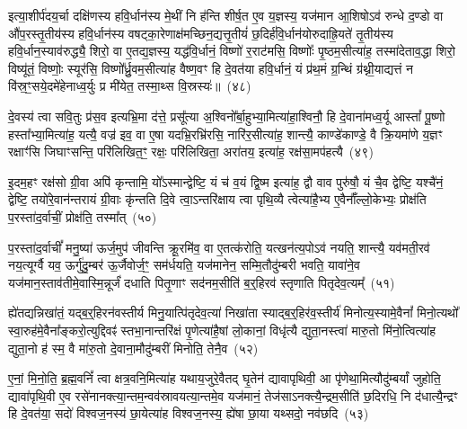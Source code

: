 इत्या॒शीर्प॑दय॒र्चा दक्षि॑णस्य हवि॒र्धान॑स्य मे॒थीं नि ह॑न्ति शीर्\mbox{}ष॒त ए॒व य॒ज्ञस्य॒ यज॑मान आ॒शिषो\-ऽव॑ रुन्धे द॒ण्डो वा औ॑प॒रस्तृ॒तीय॑स्य हवि॒र्धान॑स्य वषट्का॒रेणाक्ष॑मच्छिन॒द्यत्तृ॒तीयं॑ छ॒दिर्\mbox{}ह॑वि॒र्धान॑योरुदाह्रि॒यते॑ तृ॒तीय॑स्य हवि॒र्धान॒स्याव॑रुद्ध्यै॒ शिरो॒ वा ए॒तद्य॒ज्ञस्य॒ यद्ध॑वि॒र्धानं॒ विष्णो॑ र॒राट॑मसि॒ विष्णोः᳚ पृ॒ष्ठम॒सीत्या॑ह॒ तस्मा॑देताव॒द्धा शिरो॒ विष्यू॑तं॒ विष्णोः॒ स्यूर॑सि॒ विष्णो᳚र्ध्रु॒वम॒सीत्या॑ह वैष्ण॒वꣳ हि दे॒वत॑या हवि॒र्धानं॒ यं प्र॑थ॒मं ग्र॒न्थिं ग्र॑थ्नी॒याद्यत्तं न वि॑स्र॒ꣳ॒सये॒दमे॑हेनाध्व॒र्युः प्र मी॑येत॒ तस्मा॒थ्स वि॒स्रस्यः॑॥~(४८)

{\anuvakamend[{पत्नी॑ हन्युर्वा पृथि॒व्या विष्यू॑तं॒ विष्णोः॒ षड्विꣳ॑शतिश्च}]}%

दे॒वस्य॑ त्वा सवि॒तुः प्र॑स॒व इत्यभ्रि॒मा द॑त्ते॒ प्रसू᳚त्या अ॒श्विनो᳚र्बा॒हुभ्या॒मित्या॑हा॒श्विनौ॒ हि दे॒वाना॑मध्व॒र्यू आस्तां᳚ पू॒ष्णो हस्ता᳚भ्या॒मित्या॑ह॒ यत्यै॒ वज्र॑ इव॒ वा ए॒षा यदभ्रि॒रभ्रि॑रसि॒ नारि॑र॒सीत्या॑ह॒ शान्त्यै॒ काण्डे॑काण्डे॒ वै क्रि॒यमा॑णे य॒ज्ञꣳ रक्षाꣳ॑सि जिघाꣳसन्ति॒ परि॑लिखित॒ꣳ॒ रक्षः॒ परि॑लिखिता॒ अरा॑तय॒ इत्या॑ह॒ रक्ष॑सा॒मप॑हत्यै~(४९)

इ॒दम॒हꣳ रक्ष॑सो ग्री॒वा अपि॑ कृन्तामि॒ यो᳚\-ऽस्मान्द्वेष्टि॒ यं च॑ व॒यं द्वि॒ष्म इत्या॑ह॒ द्वौ वाव पुरु॑षौ॒ यं चै॒व द्वेष्टि॒ यश्चै॑नं॒ द्वेष्टि॒ तयो॑रे॒वान॑न्तरायं ग्री॒वाः कृ॑न्तति दि॒वे त्वा॒ऽन्तरि॑क्षाय त्वा पृथि॒व्यै त्वेत्या॑है॒भ्य ए॒वैनाँ᳚ल्लो॒केभ्यः॒ प्रोक्ष॑ति प॒रस्ता॑द॒र्वाचीं॒ प्रोक्ष॑ति॒ तस्मा᳚त्~(५०)

प॒रस्ता॑द॒र्वाचीं᳚ मनु॒ष्या॑ ऊर्ज॒मुप॑ जीवन्ति क्रू॒रमि॑व॒ वा ए॒तत्क॑रोति॒ यत्खन॑त्य॒पो\-ऽव॑ नयति॒ शान्त्यै॒ यव॑मती॒रव॑ नय॒त्यूर्ग्वै यव॒ ऊर्गु॑दु॒म्बर॑ ऊ॒र्जैवोर्ज॒ꣳ॒ सम॑र्धयति॒ यज॑मानेन॒ सम्मि॒तौदु॑म्बरी भवति॒ यावा॑ने॒व यज॑मान॒स्ताव॑तीमे॒वास्मि॒न्नूर्जं॑ दधाति पितृ॒णाꣳ सद॑नम॒सीति॑ ब॒र्॒\mbox{}हिरव॑ स्तृणाति पितृदेव॒त्यम्᳚~(५१)

ह्ये॑तद्यन्निखा॑तं॒ यद्ब॒र्॒\mbox{}हिरन॑वस्तीर्य मिनु॒यात्पि॑तृदेव॒त्या॑ निखा॑ता स्याद्ब॒र्॒\mbox{}हिर॑व॒स्तीर्य॑ मिनोत्य॒स्यामे॒वैनां᳚ मिनो॒त्यथो᳚ स्वा॒रुह॑मे॒वैना᳚ङ्करो॒त्युद्दिवꣴ॑ स्तभा॒नान्तरि॑क्षं पृ॒णेत्या॑है॒षां लो॒कानां॒ विधृ॑त्यै द्युता॒नस्त्वा॑ मारु॒तो मि॑नो॒त्वित्या॑ह द्युता॒नो ह॑ स्म॒ वै मा॑रु॒तो दे॒वाना॒मौदु॑म्बरीं मिनोति॒ तेनै॒व~(५२)

ए॒नां॒ मि॒नो॒ति॒ ब्र॒ह्म॒वनिं᳚ त्वा क्षत्र॒वनि॒मित्या॑ह यथाय॒जुरे॒वैतद् घृ॒तेन॑ द्यावा\-पृथिवी॒ आ पृ॑णेथा॒मित्यौदु॑म्बर्यां जुहोति॒ द्यावा॑\-पृथि॒वी ए॒व रसे॑नानक्त्या॒न्तम॒न्वव॑स्रावयत्या॒न्तमे॒व यज॑मानं॒ तेज॑सा\-ऽनक्त्यै॒न्द्रम॒सीति॑ छ॒दिरधि॒ नि द॑धात्यै॒न्द्रꣳ हि दे॒वत॑या॒ सदो॑ विश्वज॒नस्य॑ छा॒येत्या॑ह विश्वज॒नस्य॒ ह्ये॑षा छा॒या यथ्सदो॒ नव॑छदि~(५३)

